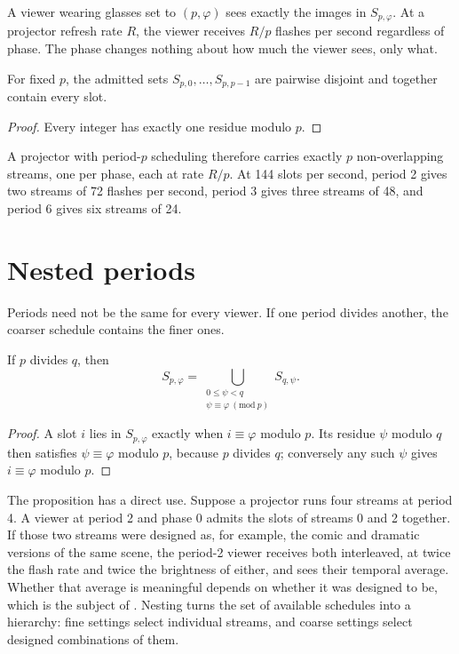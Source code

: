 A viewer wearing glasses set to $(p,\varphi)$ sees exactly the images in $S_{p,\varphi}$. At a projector refresh rate $R$, the viewer receives $R/p$ flashes per second regardless of phase. The phase changes nothing about how much the viewer sees, only what.

\begin{proposition}\label{prop:partition}
For fixed $p$, the admitted sets $S_{p,0},\ldots,S_{p,p-1}$ are pairwise disjoint and together contain every slot.
\end{proposition}

\begin{proof}
Every integer has exactly one residue modulo $p$.
\end{proof}

A projector with period-$p$ scheduling therefore carries exactly $p$ non-overlapping streams, one per phase, each at rate $R/p$. At 144 slots per second, period 2 gives two streams of 72 flashes per second, period 3 gives three streams of 48, and period 6 gives six streams of 24.

\section{Nested periods}

Periods need not be the same for every viewer. If one period divides another, the coarser schedule contains the finer ones.

\begin{proposition}\label{prop:nesting}
If $p$ divides $q$, then
\begin{equation}
S_{p,\varphi}=\bigcup_{\substack{0\le\psi<q\\ \psi\equiv\varphi \ (\mathrm{mod}\ p)}} S_{q,\psi}.
\end{equation}
\end{proposition}

\begin{proof}
A slot $i$ lies in $S_{p,\varphi}$ exactly when $i\equiv\varphi$ modulo $p$. Its residue $\psi$ modulo $q$ then satisfies $\psi\equiv\varphi$ modulo $p$, because $p$ divides $q$; conversely any such $\psi$ gives $i\equiv\varphi$ modulo $p$.
\end{proof}

The proposition has a direct use. Suppose a projector runs four streams at period 4. A viewer at period 2 and phase 0 admits the slots of streams 0 and 2 together. If those two streams were designed as, for example, the comic and dramatic versions of the same scene, the period-2 viewer receives both interleaved, at twice the flash rate and twice the brightness of either, and sees their temporal average. Whether that average is meaningful depends on whether it was designed to be, which is the subject of . Nesting turns the set of available schedules into a hierarchy: fine settings select individual streams, and coarse settings select designed combinations of them.

